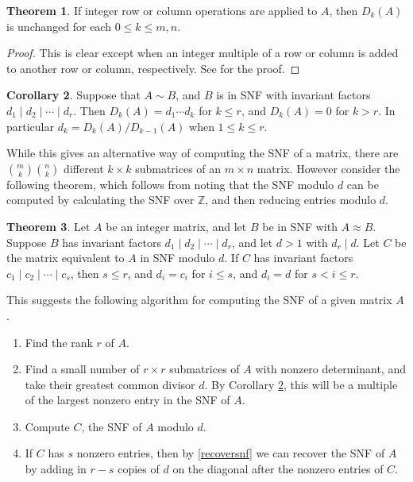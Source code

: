 \documentclass[12pt,a4paper,answers]{exam}
\newcommand{\Z}{\mathbb{Z}}
\theoremstyle{definition}
\newtheorem{theorem}{Theorem}[section]
\newtheorem{corollary}[theorem]{Corollary}
\begin{document}
\begin{theorem}
   If integer row or column operations are applied to $A$, then $D_k(A)$ is unchanged for each $0\leq k\leq m,n$.
\end{theorem}

\begin{proof}
  This is clear except when an integer multiple of a row or column is added to another row or column, respectively. See \cite[Chapter 8, Proposition 4.1]{sims} for the proof.
\end{proof}

\begin{corollary}
  \label{gcdcor}
  Suppose that $A\sim B$, and $B$ is in SNF with invariant factors $d_1\mid d_2\mid\cdots\mid d_r$. Then $D_k(A)=d_1\cdots d_k$ for $k\leq r$, and $D_k(A)=0$ for $k>r$. In particular $d_k=D_k(A)/D_{k-1}(A)$ when $1\leq k\leq r$.
\end{corollary}

While this gives an alternative way of computing the SNF of a matrix, there are $\binom{m}{k}\binom{n}{k}$ different $k\times k$ submatrices of an $m\times n$ matrix. However consider the following theorem, which follows from noting that the SNF modulo $d$ can be computed by calculating the SNF over $\Z$, and then reducing entries modulo $d$.

\begin{theorem}
  \label{recoversnf}
  Let $A$ be an integer matrix, and let $B$ be in SNF with $A\approx B$. Suppose $B$ has invariant factors $d_1\mid d_2\mid \cdots\mid d_r$, and let $d>1$ with $d_r\mid d$. Let $C$ be the matrix equivalent to $A$ in SNF modulo $d$. If $C$ has invariant factors $c_1\mid c_2\mid\cdots\mid c_s$, then $s\leq r$, and $d_i=c_i$ for $i\leq s$, and $d_i=d$ for $s<i\leq r$.
\end{theorem}

This suggests the following algorithm for computing the SNF of a given matrix $A$.

\begin{enumerate}
\item Find the rank $r$ of $A$.
\item Find a small number of $r\times r$ submatrices of $A$ with nonzero determinant, and take their greatest common divisor $d$. By Corollary \ref{gcdcor}, this will be a multiple of the largest nonzero entry in the SNF of $A$.
\item Compute $C$, the SNF of $A$ modulo $d$.
\item If $C$ has $s$ nonzero entries, then by \autoref{recoversnf} we can recover the SNF of $A$ by adding in $r-s$ copies of $d$ on the diagonal after the nonzero entries of $C$.
\end{enumerate}
\end{document}
